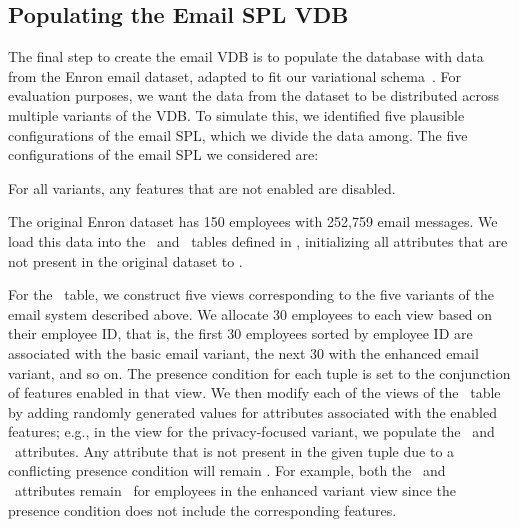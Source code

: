\subsection{Populating the Email SPL VDB}
\label{sec:enron-pop}

The final step to create the email VDB is to populate the database with data
from the Enron email dataset, adapted to fit our variational schema~\cite{Shetty04}.
%
For evaluation purposes, we want the data from the dataset to be distributed
across multiple variants of the VDB. To simulate this, we identified five
plausible configurations of the email SPL, which we divide the data among. The
five configurations of the email SPL 
 we considered are:
%
%
For all variants, any features that are not enabled are disabled. 


The original Enron dataset has 150 employees with 252,759 email messages. 
%
We load this data into the \employees\ and \messages\ tables defined in
, initializing all attributes that are not present in the
original dataset to \nul.


For the \employees\ table, we construct five views corresponding to the five
variants of the email system described above. We allocate 30 employees to each
view based on their employee ID, that is, the first 30 employees sorted by
employee ID are associated with the basic email variant, the next 30 with the
enhanced email variant, and so on. The presence condition for each tuple is set
to the conjunction of features enabled in that view.
%
We then modify each of the views of the \employees\ table by adding randomly
generated values for attributes associated with the enabled features; 
e.g., in the view for the privacy-focused variant, we populate the
\verificationkey\ and \publickey\ attributes.
%
Any attribute that is not present in the given tuple due to a conflicting
presence condition will remain \nul. For example, both the \verificationkey\
and \publickey\ attributes remain \nul\ for employees in the enhanced variant
view since the presence condition does not include the corresponding features.


